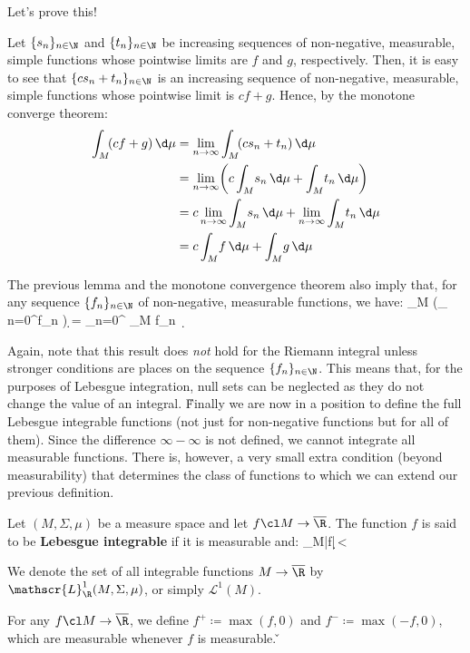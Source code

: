 Let's prove this!

\bq
Let $\{s_n\}_{n\in\N}$ and $\{t_n\}_{n\in\N}$ be increasing sequences of non-negative, measurable, simple functions
whose pointwise limits are $f$ and $g$, respectively. Then, it is easy to see that $\{cs_n+t_n\}_{n\in\N}$ is an
increasing sequence of non-negative, measurable, simple functions whose pointwise limit is $cf+g$. Hence, by the
monotone converge theorem:
{\setlength{\jot}{10pt}
\begin{align*}
\int_M\! (cf+g) \,\d \mu & = \lim_{n\to\infty}\int_M\! (cs_n+t_n) \, \d \mu\\
& = \lim_{n\to\infty}\biggl(c\int_M\! s_n \, \d \mu+\int_M\! t_n \, \d \mu\biggr)\\
& = c\lim_{n\to\infty}\int_M\! s_n \, \d \mu+\lim_{n\to\infty}\int_M\! t_n \, \d \mu\\
& = c\int_{M}\! f \,\d \mu +\int_{M}\! g \,\d \mu
\end{align*}}
\eq

The previous lemma and the monotone convergence theorem also imply that, for any sequence $\{f_n\}_{n\in\N}$ of
non-negative, measurable functions, we have:
\bse
\int_M \biggl(\sum_{\,n=0}^{\infty}f_n \biggr) \d \mu = \sum_{n=0}^{\infty} \int_M \! f_n \, \d \mu
\ese

Again, note that this result does \emph{not} hold for the Riemann integral unless stronger conditions are places on
the sequence $\{f_n\}_{n\in\N}$. This means that, for the purposes of Lebesgue integration, null sets can be
neglected as they do not change the value of an integral. \v

Finally we are now in a position to define the full Lebesgue integrable functions (not just for non-negative
functions but for all of them). Since the difference $\infty-\infty$ is not defined, we cannot integrate all
measurable functions. There is, however, a very small extra condition (beyond measurability) that determines the
class of functions to which we can extend our previous definition.

Let $(M,\Sigma,\mu)$ be a measure space and let $f\cl M\to\overline{\R}$. The function $f$ is said to be
\textbf{Lebesgue integrable} if it is measurable and:
\bse
\int_{M}\!|f|\,\d \mu < \infty
\ese
\ed

\bd [$\mathscr{L}^1(M)$]
We denote the set of all integrable functions $M\to\overline{\R}$ by $\mathscr{L}^1_{\R}(M,\Sigma,\mu)$, or simply
$\mathscr{L}^1(M)$.
\ed

For any $f\cl M\to \overline{\R}$, we define $f^+ \coloneqq \max(f,0)$ and $f^- \coloneqq \max(-f,0)$, which are
measurable whenever $f$ is measurable. \v

